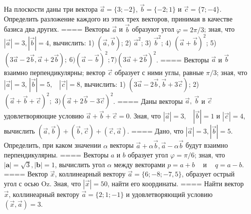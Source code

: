 На плоскости даны три вектора \(\overrightarrow{a} = \{ 3; - 2\}\), \(\overrightarrow{b} = \{ - 2;1\}\) и \(\overrightarrow{c} = \{ 7; - 4\}\). Определить разложение каждого из этих трех векторов, принимая в качестве базиса два других.
====
Векторы \(\overrightarrow{a}\) и \(\overrightarrow{b}\) образуют угол \(\varphi = 2\pi/3\); зная, что \(|\overrightarrow{a}| = 3,|\overrightarrow{b}| = 4\), вычислить: 1) \(\left( \overrightarrow{a},\overrightarrow{b} \right)\); 2) \({\overrightarrow{a}}^{2}\); 3) \({\overrightarrow{b}}^{2}\); 4) \((\overrightarrow{a} + \overrightarrow{b})^{2}\); 5) \(\left( 3\overrightarrow{a} - 2\overrightarrow{b},\overrightarrow{a} + 2\overrightarrow{b} \right);\ 6)(\overrightarrow{a} - \overrightarrow{b})^{2};7)(3\overrightarrow{a} + 2\overrightarrow{b})^{2}\).
====
Векторы \(\overrightarrow{a}\) и \(\overrightarrow{b}\) взаимно перпендикулярны; вектор \(\overrightarrow{c}\) образует с ними углы, равные \(\pi/3\); зная, что \(|\overrightarrow{a}| = 3\), \(|\overrightarrow{b}| = 5,\ \ \ \ |\overrightarrow{c}| = 8\), вычислить: 1) \(\left( 3\overrightarrow{a} - 2\overrightarrow{b},\overrightarrow{b} + 3\overrightarrow{c} \right)\); 2) \((\overrightarrow{a} + \overrightarrow{b} + \overrightarrow{c})^{2};\) \(3)(\overrightarrow{a} + 2\overrightarrow{b} - 3\overrightarrow{c})^{2}\).
====
Даны векторы \(\overrightarrow{a},\ \overrightarrow{b}\) и \(\overrightarrow{c}\) удовлетворяющие условию \(\overrightarrow{a} + \overrightarrow{b} + \overrightarrow{c} = 0\). Зная, что \(|\overrightarrow{a}| = 3,\ \ \ \ |\overrightarrow{b}| = 1\) и \(|\overrightarrow{c}| = 4\), вычислить \(\left( \overrightarrow{a},\overrightarrow{b} \right) + \left( \overrightarrow{b},\overrightarrow{c} \right) + \left( \overrightarrow{c},\overrightarrow{a} \right)\).
====
Дано, что \(|\overrightarrow{a}| = 3,|\overrightarrow{b}| = 5\). Определить, при каком значении \(\alpha\) векторы \(\overrightarrow{a} + \alpha\overrightarrow{b},\overrightarrow{a} - \alpha\overrightarrow{b}\) будут взаимно перпендикулярны.
====
Векторы \(a\) и \(b\) образует угол \(\varphi = \pi/6\); зная, что \(|\mathbf{a}| = \sqrt{3},|\mathbf{b}| = 1\), вычислить угол \(\alpha\) между векторами \(p = a + b\ \ \ \ \) и \(\ \ \ \ q = a - b\).
====
Вектор \(\overrightarrow{x}\), коллинеарный вектору \(\overrightarrow{a} = \{ 6; - 8; - 7,5\}\), образует острый угол с осью Oz. Зная, что \(|\overrightarrow{x}| = 50\), найти его координаты.
====
Найти вектор \(\overrightarrow{x}\), коллинеарный вектору \(\overrightarrow{a} = \{ 2;1; - 1\}\) и удовлетворяющий условию \(\left( \overrightarrow{x},\overrightarrow{a} \right) = 3\).
